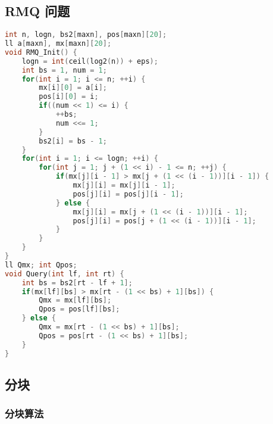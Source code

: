 \subsection{RMQ 问题}

\begin{lstlisting}[language=C++]
int n, logn, bs2[maxn], pos[maxn][20];
ll a[maxn], mx[maxn][20];
void RMQ_Init() {
    logn = int(ceil(log2(n)) + eps);
    int bs = 1, num = 1;
    for(int i = 1; i <= n; ++i) {
        mx[i][0] = a[i];
        pos[i][0] = i;
        if((num << 1) <= i) {
            ++bs;
            num <<= 1;
        }
        bs2[i] = bs - 1;
    }
    for(int i = 1; i <= logn; ++i) {
        for(int j = 1; j + (1 << i) - 1 <= n; ++j) {
            if(mx[j][i - 1] > mx[j + (1 << (i - 1))][i - 1]) {
                mx[j][i] = mx[j][i - 1];
                pos[j][i] = pos[j][i - 1];
            } else {
                mx[j][i] = mx[j + (1 << (i - 1))][i - 1];
                pos[j][i] = pos[j + (1 << (i - 1))][i - 1];
            }
        }
    }
}
ll Qmx; int Qpos;
void Query(int lf, int rt) {
    int bs = bs2[rt - lf + 1];
    if(mx[lf][bs] > mx[rt - (1 << bs) + 1][bs]) {
        Qmx = mx[lf][bs];
        Qpos = pos[lf][bs];
    } else {
        Qmx = mx[rt - (1 << bs) + 1][bs];
        Qpos = pos[rt - (1 << bs) + 1][bs];
    }
}
\end{lstlisting}

\subsection{分块}

\subsubsection{分块算法}

